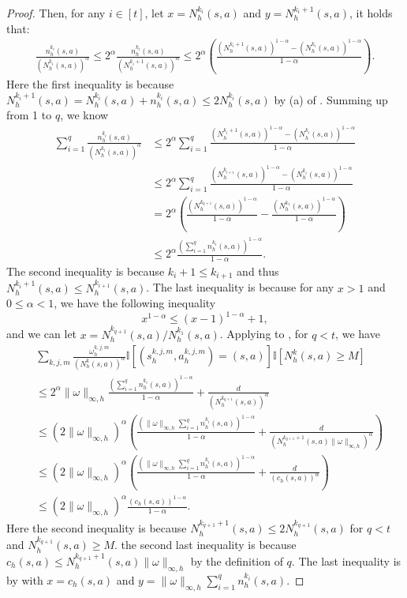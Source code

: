 \documentclass{article}
\begin{document}
\begin{proof}
Then, for any $i \in [t]$, let $x = N_h^{k_i}(s,a)$ and $y = N_h^{k_i+1}(s,a)$, it holds that:
\begin{align}
\label{nNrecur}
   \frac{n_h^{k_i}(s,a)}{(N_h^{k_i}(s,a))^{\alpha}} \leq 2^\alpha \frac{n_h^{k_i}(s,a)}{(N_h^{k_i+1}(s,a))^{\alpha}} \leq 2^\alpha \left(\frac{(N_h^{k_i+1}(s,a))^{1-\alpha}-(N_h^{k_i}(s,a))^{1-\alpha}}{1-\alpha}\right).
\end{align}
Here the first inequality is because $N_h^{k_i+1}(s,a) = N_h^{k_i}(s,a) + n_h^{k_i}(s,a)\leq 2N_h^{k_i}(s,a)$ by (a) of .
Summing up  from 1 to $q$, we know
\begin{align}
\label{nNmiddle2}
    \sum_{i=1}^{q}\frac{n_h^{k_i}(s,a)}{(N_h^{k_i}(s,a))^{\alpha}} &\leq 2^\alpha\sum_{i=1}^{q}\frac{(N_h^{k_i+1}(s,a))^{1-\alpha}-(N_h^{k_i}(s,a))^{1-\alpha}}{1-\alpha} \nonumber\\
    & \leq 2^\alpha\sum_{i=1}^{q}\frac{(N_h^{k_{i+1}}(s,a))^{1-\alpha}-(N_h^{k_i}(s,a))^{1-\alpha}}{1-\alpha} \nonumber\\
    &= 2^\alpha\left(\frac{(N_h^{k_{q+1}}(s,a))^{1-\alpha}}{1-\alpha}-\frac{(N_h^{k_1}(s,a))^{1-\alpha}}{1-\alpha}\right) \nonumber\\
    &\leq 2^\alpha \frac{\left(\sum_{i=1}^q n_h^{k_i}(s,a)\right)^{1-\alpha}}{1-\alpha}.
\end{align}
The second inequality is because $k_i+1 \leq k_{i+1}$ and thus $N_h^{k_i+1}(s,a) \leq N_h^{k_{i+1}}(s,a)$. The last inequality is because for any $x > 1$ and $0 \leq \alpha <1$, we have the following inequality
$$x^{1-\alpha} \leq (x-1)^{1-\alpha} + 1,$$
and we can let $x = N_h^{k_{q+1}}(s,a)/N_h^{k_1}(s,a)$. Applying  to , for $q < t$, we have
\begin{align}
\label{nNmiddle3}
    &\sum_{k, j, m}\frac{\omega_{h}^{k, j, m}}{(N_h^k(s,a))^{\alpha}}\mathbb{I}[(s_h^{k,j,m},a_h^{k,j,m}) = (s,a)] \mathbb{I}\left[ N_h^k(s,a)\geq M\right] \nonumber\\
    &\leq 2^\alpha\|\omega\|_{\infty,h}\frac{\left(\sum_{i=1}^q n_h^{k_i}(s,a)\right)^{1-\alpha}}{1-\alpha} + \frac{d}{(N_h^{k_{q+1}}(s,a))^{\alpha}} \nonumber\\
    &\leq 
    (2\|\omega\|_{\infty,h})^\alpha\left(\frac{\left(\|\omega\|_{\infty,h}\sum_{i=1}^q n_h^{k_i}(s,a)\right)^{1-\alpha}}{1-\alpha} + \frac{d}{(N_h^{k_{q+1}+1}(s,a)\|\omega\|_{\infty,h})^{\alpha}}\right) \nonumber \\
    &\leq (2\|\omega\|_{\infty,h})^\alpha\left(\frac{\left(\|\omega\|_{\infty,h}\sum_{i=1}^q n_h^{k_i}(s,a)\right)^{1-\alpha}}{1-\alpha} + \frac{d}{(c_h(s,a))^{\alpha}}\right) \nonumber\\
    &\leq (2\|\omega\|_{\infty,h})^\alpha\frac{(c_h(s,a))^{1-\alpha}}{1-\alpha}.
\end{align}
Here the second inequality is because $N_h^{k_{q+1}+1}(s,a) \leq 2N_h^{k_{q+1}}(s,a)$ for $q < t$ and $N_h^{k_{q+1}}(s,a) \geq M$.  the second last inequality is because $c_h(s,a) \leq N_h^{k_{q+1}+1}(s,a)\|\omega\|_{\infty,h}$ by the definition of $q$. The last inequality is by  with $x = c_h(s,a)$ and $y = \|\omega\|_{\infty,h}\sum_{i=1}^q n_h^{k_i}(s,a)$.


\end{proof}
\end{document}

